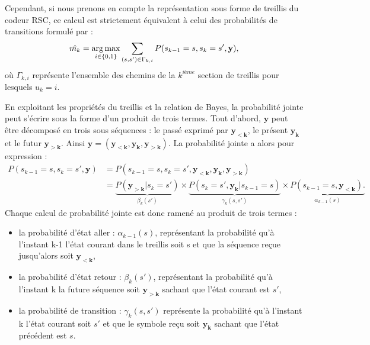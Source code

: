 Cependant, si nous prenons en compte la représentation sous forme de treillis du codeur RSC, ce calcul est strictement 
équivalent à celui des probabilités de transitions formulé par : 
\[\hat{m_k} = \operatorname*{arg\,max}_{i\in\{0,1\}} \sum\limits_{(s,s')\in\Gamma_{k,i}}P(s_{k-1}=s, s_{k}=s',\mathbf{y}),\]
où $\Gamma_{k,i}$ représente l'ensemble des chemins de la ${k^{ième}}$ section de treillis pour lesquels $u_k=i$. 

En exploitant les propriétés du treillis et la relation de Bayes, la probabilité jointe peut s'écrire sous la forme d'un 
produit de trois termes. Tout d'abord, $\mathbf{y}$ peut être décomposé en trois sous séquences : le passé exprimé par 
$\mathbf{y_{<k}}$, le présent $\mathbf{y_k}$ et le futur $\mathbf{y_{>k}}$. Ainsi $\mathbf{y} = (\mathbf{y_{<k}}, \mathbf{y_k}, \mathbf{y_{>k}}).$ 
La probabilité jointe a alors pour expression : 
\begin{align*}
	P(s_{k-1}=s, s_{k}=s',\mathbf{y}) & = P(s_{k-1}=s, s_{k}=s',\mathbf{y_{<k}},\mathbf{y_{k}},\mathbf{y_{>k}})                                                                                                                              \\
	                                  & = \underbrace{P(\mathbf{y_{>k}}|s_{k}=s')}_{\beta_k(s')}\times \underbrace{P(s_{k}=s',\mathbf{y_{k}}|s_{k-1}=s)}_{\gamma_k(s,s')}\times \underbrace{P(s_{k-1}=s,\mathbf{y_{<k}}).}_{\alpha_{k-1}(s)} 
\end{align*}
Chaque calcul de probabilité jointe est donc ramené au produit de trois termes :
\begin{itemize}
	\item la probabilité d'état aller : $\alpha_{k-1}(s)$, représentant la probabilité qu'à l'instant k-1 l'état courant 
	dans le treillis soit s et que la séquence reçue jusqu'alors soit $\mathbf{y_{<k}}$,
	\item la probabilité d'état retour : $\beta_k(s')$, représentant la probabilité qu'à l'instant k la future séquence 
	soit $\mathbf{y_{>k}}$ sachant que l'état courant est $s'$,
	\item la probabilité de transition : $\gamma_k(s,s')$ représente la probabilité qu'à l'instant k l'état courant soit 
	$s'$ et que le symbole reçu soit $\mathbf{y_k}$ sachant que l'état précédent est $s$.
\end{itemize}
